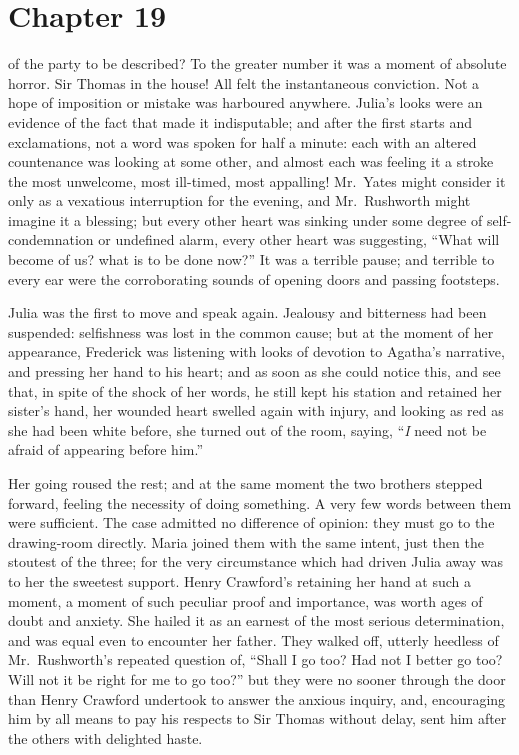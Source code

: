 \chapter{Chapter 19}

 of the party to be described?
To the greater number it was a moment of absolute horror.
Sir Thomas in the house!  All felt the instantaneous conviction.
Not a hope of imposition or mistake was harboured anywhere.
Julia's looks were an evidence of the fact that made
it indisputable; and after the first starts and exclamations,
not a word was spoken for half a minute:  each with
an altered countenance was looking at some other,
and almost each was feeling it a stroke the most unwelcome,
most ill-timed, most appalling!  Mr.\ Yates might consider
it only as a vexatious interruption for the evening,
and Mr.\ Rushworth might imagine it a blessing; but every
other heart was sinking under some degree of self-condemnation
or undefined alarm, every other heart was suggesting,
``What will become of us? what is to be done now?''
It was a terrible pause; and terrible to every ear were the
corroborating sounds of opening doors and passing footsteps.

Julia was the first to move and speak again.  Jealousy and
bitterness had been suspended:  selfishness was lost
in the common cause; but at the moment of her appearance,
Frederick was listening with looks of devotion to
Agatha's narrative, and pressing her hand to his heart;
and as soon as she could notice this, and see that,
in spite of the shock of her words, he still kept his
station and retained her sister's hand, her wounded
heart swelled again with injury, and looking as red
as she had been white before, she turned out of the room,
saying, ``\emph{I} need not be afraid of appearing before him.''

Her going roused the rest; and at the same moment
the two brothers stepped forward, feeling the necessity
of doing something.  A very few words between them
were sufficient.  The case admitted no difference
of opinion:  they must go to the drawing-room directly.
Maria joined them with the same intent, just then the
stoutest of the three; for the very circumstance which
had driven Julia away was to her the sweetest support.
Henry Crawford's retaining her hand at such a moment,
a moment of such peculiar proof and importance,
was worth ages of doubt and anxiety.  She hailed it
as an earnest of the most serious determination, and was
equal even to encounter her father.  They walked off,
utterly heedless of Mr.\ Rushworth's repeated question of,
``Shall I go too?  Had not I better go too?  Will not it
be right for me to go too?'' but they were no sooner
through the door than Henry Crawford undertook to answer
the anxious inquiry, and, encouraging him by all means
to pay his respects to Sir Thomas without delay,
sent him after the others with delighted haste.

